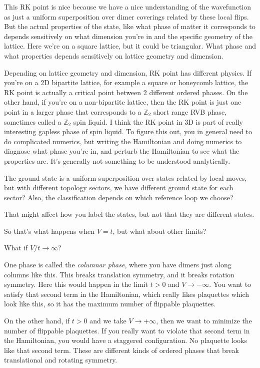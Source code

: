This RK point is nice because we have a nice understanding of the wavefunction
as just a uniform superposition over dimer coverings related by these local
flips.
But the actual properties of the state,
like what phase of matter it corresponds to depends sensitively on what
dimension you're in and the specific geometry of the lattice.
Here we're on a square lattice,
but it could be triangular.
What phase and what properties depends sensitively on lattice geometry and
dimension.

Depending on lattice geometry and dimension,
RK point has different physics.
If you're on a 2D bipartite lattice,
for example a square or honeycomb lattice,
the RK point is actually a critical point
between 2 different ordered phases.
On the other hand,
if you're on a non-bipartite lattice,
then the RK point is just one point in a larger phase that corresponds to a
$\mathbb{Z}_2$ short
range RVB phase,
sometimes called a $\mathbb{Z}_2$ spin liquid.
I think the RK point in 3D is part of really interesting gapless phase of spin
liquid.
To figure this out,
you in general need to do complicated numerics,
but writing the Hamiltonian and doing numerics to diagnose what phase you're
in,
and perturb the Hamiltonian to see what the properties are.
It's generally not something to be understood analytically.

\begin{question}
    The ground state is a uniform superposition over states related by local
    moves,
    but with different topology sectors,
    we have different ground state for each sector?
    Also, the classification depends on which reference loop we choose?
\end{question}
That might affect how you label the states,
but not that they are different states.

So that's what happens when $V=t$,
but what about other limits?

What if $V/t \to \infty$?

One phase is called the \emph{columnar phase},
where you have dimers just along columns like this.
This breaks translation symmetry,
and it breaks rotation symmetry.
Here this would happen in the limit $t>0$ and $V\to -\infty$.
You want to satisfy that second term in the Hamiltonian,
which really likes plaquettes which look like this,
so it has the maximum number of flippable plaquettes.

On the other hand,
if $t>0$ and we take $V\to +\infty$,
then we want to minimize the number of flippable plaquettes.
If you really want to violate that second term in the Hamiltonian,
you would have a staggered configuration.
No plaquette looks like that second term.
These are different kinds of ordered phases that break translational and rotating
symmetry.

